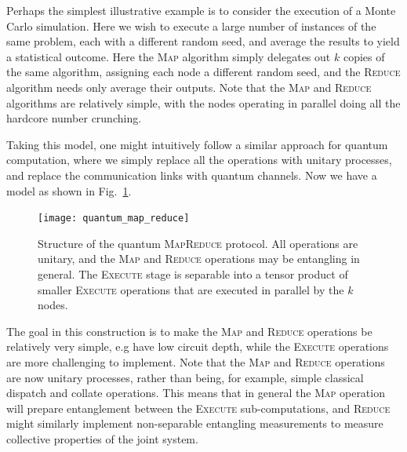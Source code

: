 Perhaps the simplest illustrative example is to consider the execution of a Monte Carlo simulation. Here we wish to execute a large number of instances of the same problem, each with a different random seed, and average the results to yield a statistical outcome. Here the \textsc{Map} algorithm simply delegates out $k$ copies of the same algorithm, assigning each node a different random seed, and the \textsc{Reduce} algorithm needs only average their outputs. Note that the \textsc{Map} and \textsc{Reduce} algorithms are relatively simple, with the nodes operating in parallel doing all the hardcore number crunching.

Taking this model, one might intuitively follow a similar approach for quantum computation, where we simply replace all the operations with unitary processes, and replace the communication links with quantum channels. Now we have a model as shown in Fig.~\ref{fig:quant_map_red}.

\begin{figure}
\texttt{[image: quantum\_map\_reduce]}
\captionspacefig \caption{Structure of the quantum \textsc{MapReduce} protocol. All operations are unitary, and the \textsc{Map} and \textsc{Reduce} operations may be entangling in general. The \textsc{Execute} stage is separable into a tensor product of smaller \textsc{Execute} operations that are executed in parallel by the $k$ nodes.}\label{fig:quant_map_red}	
\end{figure}

The goal in this construction is to make the \textsc{Map} and \textsc{Reduce} operations be relatively very simple, e.g have low circuit depth, while the \textsc{Execute} operations are more challenging to implement. Note that the \textsc{Map} and \textsc{Reduce} operations are now unitary processes, rather than being, for example, simple classical dispatch and collate operations. This means that in general the \textsc{Map} operation will prepare entanglement between the \textsc{Execute} sub-computations, and \textsc{Reduce} might similarly implement non-separable entangling measurements to measure collective properties of the joint system.

